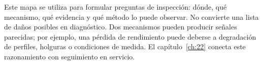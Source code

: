 Este mapa se utiliza para formular preguntas de inspección: dónde, qué mecanismo, qué evidencia y qué método lo puede observar. No convierte una lista de daños posibles en diagnóstico. Dos mecanismos pueden producir señales parecidas; por ejemplo, una pérdida de rendimiento puede deberse a degradación de perfiles, holguras o condiciones de medida. El capítulo~\ref{ch:22} conecta este razonamiento con seguimiento en servicio.
